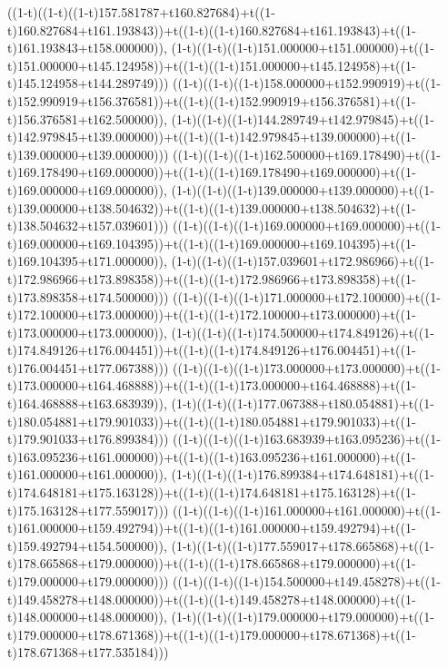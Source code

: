 ((1-t)((1-t)((1-t)157.581787+t160.827684)+t((1-t)160.827684+t161.193843))+t((1-t)((1-t)160.827684+t161.193843)+t((1-t)161.193843+t158.000000)),                                     (1-t)((1-t)((1-t)151.000000+t151.000000)+t((1-t)151.000000+t145.124958))+t((1-t)((1-t)151.000000+t145.124958)+t((1-t)145.124958+t144.289749)))
((1-t)((1-t)((1-t)158.000000+t152.990919)+t((1-t)152.990919+t156.376581))+t((1-t)((1-t)152.990919+t156.376581)+t((1-t)156.376581+t162.500000)),                                     (1-t)((1-t)((1-t)144.289749+t142.979845)+t((1-t)142.979845+t139.000000))+t((1-t)((1-t)142.979845+t139.000000)+t((1-t)139.000000+t139.000000)))
((1-t)((1-t)((1-t)162.500000+t169.178490)+t((1-t)169.178490+t169.000000))+t((1-t)((1-t)169.178490+t169.000000)+t((1-t)169.000000+t169.000000)),                                     (1-t)((1-t)((1-t)139.000000+t139.000000)+t((1-t)139.000000+t138.504632))+t((1-t)((1-t)139.000000+t138.504632)+t((1-t)138.504632+t157.039601)))
((1-t)((1-t)((1-t)169.000000+t169.000000)+t((1-t)169.000000+t169.104395))+t((1-t)((1-t)169.000000+t169.104395)+t((1-t)169.104395+t171.000000)),                                     (1-t)((1-t)((1-t)157.039601+t172.986966)+t((1-t)172.986966+t173.898358))+t((1-t)((1-t)172.986966+t173.898358)+t((1-t)173.898358+t174.500000)))
((1-t)((1-t)((1-t)171.000000+t172.100000)+t((1-t)172.100000+t173.000000))+t((1-t)((1-t)172.100000+t173.000000)+t((1-t)173.000000+t173.000000)),                                     (1-t)((1-t)((1-t)174.500000+t174.849126)+t((1-t)174.849126+t176.004451))+t((1-t)((1-t)174.849126+t176.004451)+t((1-t)176.004451+t177.067388)))
((1-t)((1-t)((1-t)173.000000+t173.000000)+t((1-t)173.000000+t164.468888))+t((1-t)((1-t)173.000000+t164.468888)+t((1-t)164.468888+t163.683939)),                                     (1-t)((1-t)((1-t)177.067388+t180.054881)+t((1-t)180.054881+t179.901033))+t((1-t)((1-t)180.054881+t179.901033)+t((1-t)179.901033+t176.899384)))
((1-t)((1-t)((1-t)163.683939+t163.095236)+t((1-t)163.095236+t161.000000))+t((1-t)((1-t)163.095236+t161.000000)+t((1-t)161.000000+t161.000000)),                                     (1-t)((1-t)((1-t)176.899384+t174.648181)+t((1-t)174.648181+t175.163128))+t((1-t)((1-t)174.648181+t175.163128)+t((1-t)175.163128+t177.559017)))
((1-t)((1-t)((1-t)161.000000+t161.000000)+t((1-t)161.000000+t159.492794))+t((1-t)((1-t)161.000000+t159.492794)+t((1-t)159.492794+t154.500000)),                                     (1-t)((1-t)((1-t)177.559017+t178.665868)+t((1-t)178.665868+t179.000000))+t((1-t)((1-t)178.665868+t179.000000)+t((1-t)179.000000+t179.000000)))
((1-t)((1-t)((1-t)154.500000+t149.458278)+t((1-t)149.458278+t148.000000))+t((1-t)((1-t)149.458278+t148.000000)+t((1-t)148.000000+t148.000000)),                                     (1-t)((1-t)((1-t)179.000000+t179.000000)+t((1-t)179.000000+t178.671368))+t((1-t)((1-t)179.000000+t178.671368)+t((1-t)178.671368+t177.535184)))
